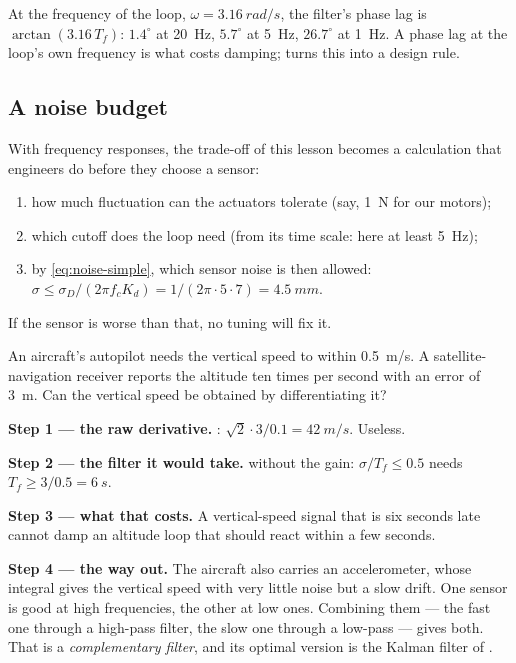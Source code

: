 At the frequency of the loop, $\omega = \SI{3.16}{rad/s}$, the filter's phase lag is $\arctan(3.16\,T_f)$: $1.4^\circ$ at \SI{20}{Hz}, $5.7^\circ$ at \SI{5}{Hz}, $26.7^\circ$ at \SI{1}{Hz}. A phase lag at the loop's own frequency is what costs damping;  turns this into a design rule.

\subsection{A noise budget}
With frequency responses, the trade-off of this lesson becomes a calculation that engineers do before they choose a sensor:
\begin{enumerate}
  \item how much fluctuation can the actuators tolerate (say, \SI{1}{N} for our motors);
  \item which cutoff does the loop need (from its time scale: here at least \SI{5}{Hz});
  \item by \cref{eq:noise-simple}, which sensor noise is then allowed: $\sigma \le \sigma_D/(2\pi f_cK_d) = 1/(2\pi \cdot 5 \cdot 7) = \SI{4.5}{mm}$.
\end{enumerate}
If the sensor is worse than that, no tuning will fix it.

\begin{example}
\label{ex:noise-gps}
An aircraft's autopilot needs the vertical speed to within \SI{0.5}{m/s}. A satellite-navigation receiver reports the altitude ten times per second with an error of \SI{3}{m}. Can the vertical speed be obtained by differentiating it?

\textbf{Step 1 — the raw derivative.} : $\sqrt2 \cdot 3/0.1 = \SI{42}{m/s}$. Useless.

\textbf{Step 2 — the filter it would take.}  without the gain: $\sigma/T_f \le 0.5$ needs $T_f \ge 3/0.5 = \SI{6}{s}$.

\textbf{Step 3 — what that costs.} A vertical-speed signal that is six seconds late cannot damp an altitude loop that should react within a few seconds.

\textbf{Step 4 — the way out.} The aircraft also carries an accelerometer, whose integral gives the vertical speed with very little noise but a slow drift. One sensor is good at high frequencies, the other at low ones. Combining them — the fast one through a high-pass filter, the slow one through a low-pass — gives both. That is a \emph{complementary filter}, and its optimal version is the Kalman filter of .
\end{example}

